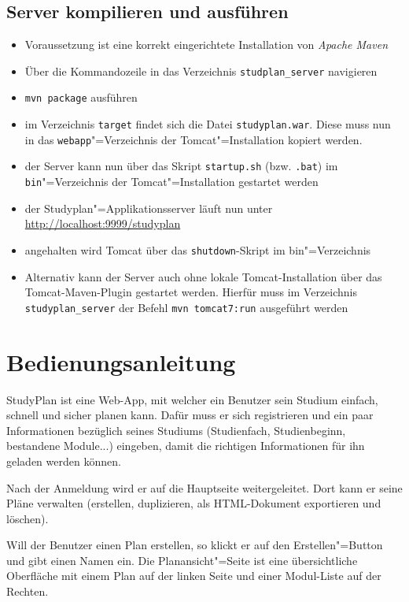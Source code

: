 \subsection{Server kompilieren und ausführen}
\begin{itemize}
	\item Voraussetzung ist eine korrekt eingerichtete Installation von \textit{Apache Maven}
	\item Über die Kommandozeile in das Verzeichnis \texttt{studplan\_server} navigieren
	\item \texttt{mvn package} ausführen
	\item im Verzeichnis \texttt{target} findet sich die Datei \texttt{studyplan.war}. Diese muss nun in das \texttt{webapp}"=Verzeichnis der Tomcat"=Installation kopiert werden.
	\item der Server kann nun über das Skript \texttt{startup.sh} (bzw. \texttt{.bat}) im \texttt{bin}"=Verzeichnis der Tomcat"=Installation gestartet werden
	\item der Studyplan"=Applikationsserver läuft nun unter \url{http://localhost:9999/studyplan}
	\item angehalten wird Tomcat über das \texttt{shutdown}-Skript im bin"=Verzeichnis
	\item Alternativ kann der Server auch ohne lokale Tomcat-Installation über das Tomcat-Maven-Plugin gestartet werden. Hierfür muss im Verzeichnis \texttt{studyplan\_server} der Befehl \texttt{mvn tomcat7:run} ausgeführt werden
\end{itemize}

\section{Bedienungsanleitung}

StudyPlan ist eine Web-App, mit welcher ein Benutzer sein Studium einfach, schnell und sicher planen kann. Dafür muss er sich registrieren und ein paar Informationen bezüglich seines Studiums (Studienfach, Studienbeginn, bestandene Module...) eingeben, damit die richtigen Informationen für ihn geladen werden können. 

Nach der Anmeldung wird er auf die Hauptseite weitergeleitet. Dort kann er seine Pläne verwalten (erstellen, duplizieren, als HTML-Dokument exportieren und löschen). 

Will der Benutzer einen Plan erstellen, so klickt er auf den Erstellen"=Button und gibt einen Namen ein. Die Planansicht"=Seite ist eine übersichtliche Oberfläche mit einem Plan auf der linken Seite und einer Modul-Liste auf der Rechten.

